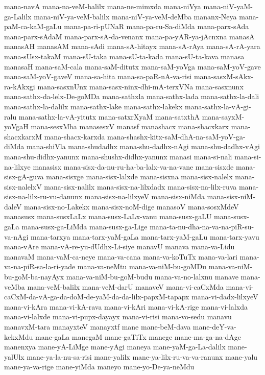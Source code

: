 {mana-navA
mana-na-veM-balilx
mana-ne-mimxda
mana-niVya
mana-niV-yaM-ga-Lalilx
mana-niV-ya-veM-balilx
mana-niV-ya-veM-deMba
mananx-Neya
mana-paM-ca-kaM-gaLu
mana-pa-ri-pUNaR
mana-pa-ru-Sa-diMda
mana-parx-sAda
mana-parx-sAdaM
mana-parx-sA-da-venanx
mana-pa-yAR-ya-jAcnxna
manasA
manasAH
manasAM
mana-sAdi
mana-sA-hitayx
mana-sA-rAya
mana-sA-rA-yara
mana-sUsx-takaM
mana-sU-taka
mana-sU-ta-kada
mana-sU-ta-kava
manasa
manasaH
mana-saM-cala
mana-saM-ditutx
mana-saM-yoVga
mana-saM-yoV-gave
mana-saM-yoV-gaveV
mana-sa-hita
mana-sa-paR-nA-va-risi
mana-sasxM-sAkx-ra-kAkxgi
mana-sasxnUnx
mana-sasx-ninx-dhi-mA-terxVNa
mana-sasxnunx
mana-sathx-da-lelx-De-goMDa
mana-sathxla
mana-sathx-lada
mana-sathx-la-dali
mana-sathx-la-dalilx
mana-sathx-lake
mana-sathx-lakekx
mana-sathx-la-vA-gi-ralu
mana-sathx-la-vA-yitutx
mana-satxrXyaM
mana-satxthA
mana-sayxM-yoVgaH
mana-sesxMba
manasesxV
manasf
manashacx
mana-shacxkarx
mana-shacxkarxM
mana-shacx-karxda
mana-shashx-kitx-saM-dhA-na-saM-yoV-ga-diMda
mana-shiVla
mana-shudadhx
mana-shu-dadhx-nAgi
mana-shu-dadhx-vAgi
mana-shu-didhx-yanunx
mana-shushx-didhx-yanunx
manasi
mana-si-nali
mana-si-na-lilxye
manasisx
mana-sisx-da-nu-ru-ha-ba-lalx-va-na-vane
mana-sisxde
mana-sisx-gA-guva
mana-sisxge
mana-sisx-lalxde
mana-sisxna
mana-sisx-nalelx
mana-sisx-nalelxV
mana-sisx-nalilx
mana-sisx-na-lilxdadx
mana-sisx-na-lilx-ruva
mana-sisx-na-lilx-ru-vu-danunx
mana-sisx-na-lilxyeV
mana-sisx-niMda
mana-sisx-niM-daleV
mana-sisx-no-Lakekx
mana-sisx-noM-dige
manasoV
mana-sosxMdeV
manasusx
mana-susxLaLx
mana-susx-LaLx-vanu
mana-susx-gaLU
mana-susx-gaLa
mana-susx-ga-LiMda
mana-susx-ga-Lige
mana-ta-nu-dha-na-va-na-piR-su-va-nAgi
mana-tarxya
mana-tarx-yaM-gaLa
mana-tarx-yaM-gaLu
mana-tarx-yavu
mana-vAre
mana-vA-re-yu-dUdhx-Li-siye
manavU
manava
mana-va-Lidu
manavaM
mana-vaM-ca-neye
mana-va-cana
mana-va-koTuTx
mana-va-lari
mana-va-na-piR-sa-la-ri-yade
mana-va-neMtu
mana-va-niM-bu-goMDu
mana-va-niM-bu-goM-ba-nayAyx
mana-va-niM-bu-goM-budu
mana-va-no-lalxnu
manave
mana-veMba
mana-veM-balilx
mana-veM-darU
manaveV
mana-vi-caCxMda
mana-vi-caCxM-da-vA-ga-da-doM-de-yaM-da-da-lilx-papxM-tapapx
mana-vi-dadx-lilxyeV
mana-vi-kAra
mana-vi-kA-rava
mana-vi-kAri
mana-vi-kA-rige
mana-vi-lalxda
mana-vi-lalxde
mana-vi-pupx-dayayx
mana-vi-risi
mana-vo-sedu
manavu
manavxM-tara
manayxteV
manayxtf
mane
mane-beM-dava
mane-deY-va-kekxMdu
mane-gaLa
manegaM
mane-gaTiTx
manege
mane-ma-ga-na-dAge
manenxya
mane-yA-LiMge
mane-yAgi
maneya
mane-yaM-ga-La-dalilx
mane-yalUlx
mane-ya-la-nu-sa-risi
mane-yalilx
mane-ya-lilx-ru-va-va-ranunx
mane-yalu
mane-ya-va-rige
mane-yiMda
maneyo
mane-yo-De-ya-neMdu
}
